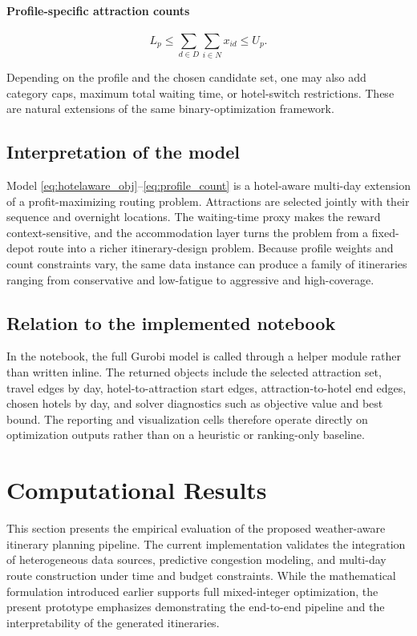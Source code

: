 \documentclass[12pt,a4paper]{article}
\begin{document}
\paragraph{Profile-specific attraction counts}
\begin{equation}
L_p \le \sum_{d \in D}\sum_{i \in N} x_{id} \le U_p.
\label{eq:profile_count}
\end{equation}

Depending on the profile and the chosen candidate set, one may also add category caps, maximum total waiting time, or hotel-switch restrictions. These are natural extensions of the same binary-optimization framework.

\subsection{Interpretation of the model}

Model \eqref{eq:hotelaware_obj}--\eqref{eq:profile_count} is a hotel-aware multi-day extension of a profit-maximizing routing problem. Attractions are selected jointly with their sequence and overnight locations. The waiting-time proxy makes the reward context-sensitive, and the accommodation layer turns the problem from a fixed-depot route into a richer itinerary-design problem. Because profile weights and count constraints vary, the same data instance can produce a family of itineraries ranging from conservative and low-fatigue to aggressive and high-coverage.

\subsection{Relation to the implemented notebook}

In the notebook, the full Gurobi model is called through a helper module rather than written inline. The returned objects include the selected attraction set, travel edges by day, hotel-to-attraction start edges, attraction-to-hotel end edges, chosen hotels by day, and solver diagnostics such as objective value and best bound. The reporting and visualization cells therefore operate directly on optimization outputs rather than on a heuristic or ranking-only baseline.


\section{Computational Results}

This section presents the empirical evaluation of the proposed weather-aware itinerary planning pipeline. The current implementation validates the integration of heterogeneous data sources, predictive congestion modeling, and multi-day route construction under time and budget constraints. While the mathematical formulation introduced earlier supports full mixed-integer optimization, the present prototype emphasizes demonstrating the end-to-end pipeline and the interpretability of the generated itineraries.
\end{document}
